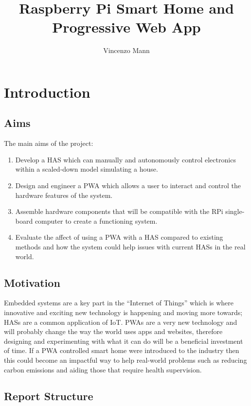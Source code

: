 \documentclass[final]{cmpreport}
\title{Raspberry Pi Smart Home and Progressive Web App}
\author{Vincenzo Mann}
\begin{document}

\section{Introduction}\label{introduction}

    \subsection{Aims}
    
    The main aims of the project:

    \begin{enumerate}
        \item Develop a HAS which can manually and autonomously control electronics within a scaled-down model simulating a house.
        \item Design and engineer a PWA which allows a user to interact and control the hardware features of the system.
        \item Assemble hardware components that will be compatible with the RPi single-board computer to create a functioning system.
        \item Evaluate the affect of using a PWA with a HAS compared to existing methods and how the system could help issues with current HASs in the real world.
    \end{enumerate}

    \subsection{Motivation}

    Embedded systems are a key part in the ``Internet of Things'' which is where innovative and exciting new technology is happening and moving more towards; HASs are a common application of IoT. PWAs are a very new technology and will probably change the way the world uses apps and websites, therefore designing and experimenting with what it can do will be a beneficial investment of time. If a PWA controlled smart home were introduced to the industry then this could become an impactful way to help real-world problems such as reducing carbon emissions and aiding those that require health supervision.
    
    \subsection{Report Structure}
    
\end{document}
